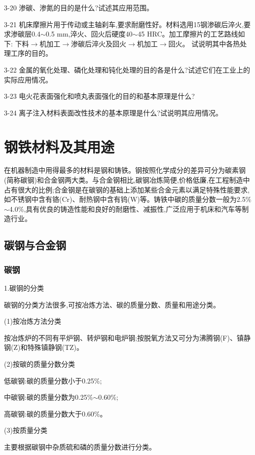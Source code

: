 \documentclass[UTF8]{ctexbook}
\newcommand{\◎}{\ensuremath{\bigcirc}}
\begin{document}
3-20 渗碳、渗氮的目的是什么?试述其应用范围。

3-21 机床摩擦片用于传动或主轴刹车,要求耐磨性好。材料选用15钢渗碳后淬火,要求渗碳层0.4$\sim$0.5 mm,淬火、回火后硬度40$\sim$45 HRC。加工摩擦片的工艺路线如下:
下料$\rightarrow$机加工$\rightarrow$渗碳后淬火及回火$\rightarrow$机加工$\rightarrow$回火。
试说明其中各热处理工序的目的。

3-22 金属的氧化处理、磷化处理和钝化处理的目的各是什么?试述它们在工业上的实际应用情况。

3-23 电火花表面强化和喷丸表面强化的目的和基本原理是什么?

3-24 离子注入材料表面改性技术的基本原理是什么?试说明其应用情况。



\chapter{钢铁材料及其用途}

在机器制造中用得最多的材料是钢和铸铁。钢按照化学成分的差异可分为碳素钢(简称碳钢)和合金钢两大类。与合金钢相比,碳钢冶炼简便,价格低廉,在工程制造中占有很大的比例;合金钢是在碳钢的基础上添加某些合金元素以满足特殊性能要求,如不锈钢中含有铬(Cr)、耐热钢中含有钨(W)等。铸铁中碳的质量分数一般为2.5\%$\sim$4.0\%,具有优良的铸造性能和良好的耐磨性、减振性,广泛应用于机床和汽车等制造行业。

\section{碳钢与合金钢}

\subsection{碳钢}

1.碳钢的分类

碳钢的分类方法很多,可按冶炼方法、碳的质量分数、质量和用途分类。

(1)按冶炼方法分类

按冶炼炉的不同有平炉钢、转炉钢和电炉钢;按脱氧方法又可分为沸腾钢(F)、镇静钢(Z)和特殊镇静钢(TZ)。

(2)按碳的质量分数分类

低碳钢:碳的质量分数小于0.25\%;

中碳钢:碳的质量分数为0.25\%$\sim$0.60\%;

高碳钢:碳的质量分数大于0.60\%。

(3)按质量分类

主要根据碳钢中杂质硫和磷的质量分数进行分类。
\end{document}
